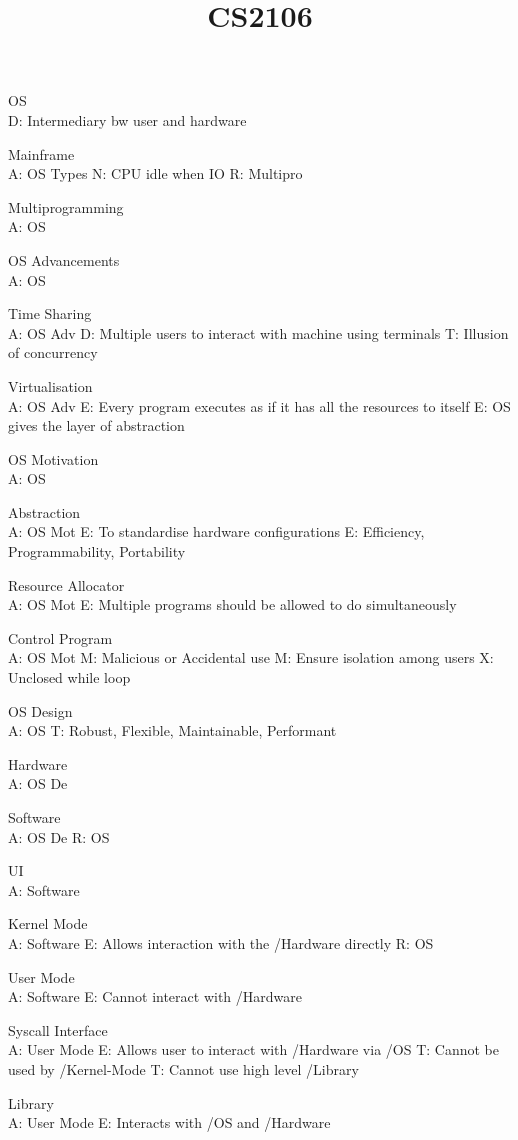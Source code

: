 \documentclass{article}
\begin{document}
\title{CS2106}

OS\\
D: Intermediary bw user and hardware

Mainframe\\
A: OS Types
N: CPU idle when IO
R: Multipro

Multiprogramming\\
A: OS

OS Advancements\\
A: OS

Time Sharing\\
A: OS Adv
D: Multiple users to interact with machine using terminals
T: Illusion of concurrency

Virtualisation\\
A: OS Adv
E: Every program executes as if it has all the resources to itself
E: OS gives the layer of abstraction

OS Motivation\\
A: OS

Abstraction\\
A: OS Mot
E: To standardise hardware configurations
E: Efficiency, Programmability, Portability

Resource Allocator\\
A: OS Mot
E: Multiple programs should be allowed to do simultaneously

Control Program\\
A: OS Mot
M: Malicious or Accidental use
M: Ensure isolation among users
X: Unclosed while loop

OS Design\\
A: OS
T: Robust, Flexible, Maintainable, Performant

Hardware\\
A: OS De

Software\\
A: OS De
R: OS

UI\\
A: Software

Kernel Mode\\
A: Software
E: Allows interaction with the /Hardware directly
R: OS

User Mode\\
A: Software
E: Cannot interact with /Hardware

Syscall Interface\\
A: User Mode
E: Allows user to interact with /Hardware via /OS
T: Cannot be used by /Kernel-Mode
T: Cannot use high level /Library

Library\\
A: User Mode
E: Interacts with /OS and /Hardware
\end{document}
